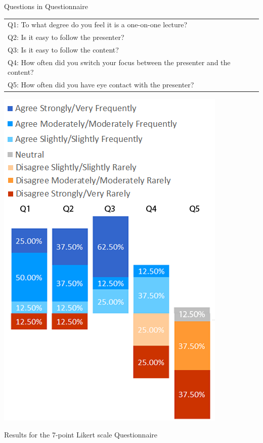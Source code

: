 \documentclass[sigchi-a]{acmart}
\begin{document}
\begin{margintable}
\vspace{-3cm}
    \caption{Questions in Questionnaire}
    \label{tab:table2}
    \begin{tabular}{p{5.5cm}}
    \toprule
      Q1: To what degree do you feel it is a one-on-one lecture?\\
      Q2: Is it easy to follow the presenter?\\
      Q3: Is it easy to follow the content?\\
      Q4: How often did you switch your focus between the presenter and the content?\\
      Q5: How often did you have eye contact with the presenter?\\
      \bottomrule
    \end{tabular}
\end{margintable}

\begin{marginfigure}
    \includegraphics[width=0.9\marginparwidth]{lr2}
    \caption{Results for the 7-point Likert scale Questionnaire}
    \label{fig:results}
\end{marginfigure}



\end{document}
